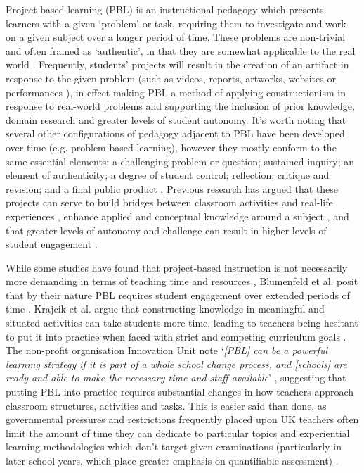 Project-based learning (PBL) is an instructional pedagogy which presents learners with a given `problem' or task, requiring them to investigate and work on a given subject over a longer period of time. These problems are non-trivial and often framed as `authentic', in that they are somewhat applicable to the real world \citep{Blumenfeld1991}. Frequently, students' projects will result in the creation of an artifact in response to the given problem (such as videos, reports, artworks, websites or performances \citep{Holubova2008}), in effect making PBL a method of applying constructionism in response to real-world problems and supporting the inclusion of prior knowledge, domain research and greater levels of student autonomy. It's worth noting that several other configurations of pedagogy adjacent to PBL have been developed over time (e.g. problem-based learning), however they mostly conform to the same essential elements: a challenging problem or question; sustained inquiry; an element of authenticity; a degree of student control; reflection; critique and revision; and a final public product \citep{Larmer2015}. Previous research has argued that these projects can serve to build bridges between classroom activities and real-life experiences \citep{Blumenfeld1991}, enhance applied and conceptual knowledge around a subject \citep{Boaler1999}, and that greater levels of autonomy and challenge can result in higher levels of student engagement \citep{Wurdinger2007}.

While some studies have found that project-based instruction is not necessarily more demanding in terms of teaching time and resources \citep{Al-Balushi2014}, Blumenfeld et al. posit that by their nature PBL requires student engagement over extended periods of time \citep{Blumenfeld1991}. Krajcik et al. argue that constructing knowledge in meaningful and situated activities can take students more time, leading to teachers being hesitant to put it into practice when faced with strict and competing curriculum goals \citep{Krajcik2006}. The non-profit organisation Innovation Unit note `\textit{[PBL] can be a powerful learning strategy if it is part of a whole school change process, and [schools] are ready and able to make the necessary time and staff available}' \citep{InnovationUnit2016}, suggesting that putting PBL into practice requires substantial changes in how teachers approach classroom structures, activities and tasks. This is easier said than done, as governmental pressures and restrictions frequently placed upon UK teachers often limit the amount of time they can dedicate to particular topics and experiential learning methodologies which don't target given examinations (particularly in later school years, which place greater emphasis on quantifiable assessment) \citep{Ofsted2018}.

